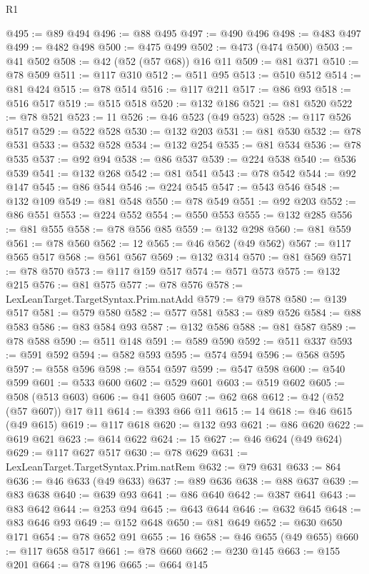 \begin{lexlean}{R1}
\begin{coremodule}
@495 := @89 @494
@496 := @88 @495
@497 := @490 @496
@498 := @483 @497
@499 := @482 @498
@500 := @475 @499
@502 := @473 (@474 @500)
@503 := @41 @502
@508 := @42 (@52 (@57 @68)) @16 @11
@509 := @81 @371
@510 := @78 @509
@511 := @117 @310
@512 := @511 @95
@513 := @510 @512
@514 := @81 @424
@515 := @78 @514
@516 := @117 @211
@517 := @86 @93
@518 := @516 @517
@519 := @515 @518
@520 := @132 @186
@521 := @81 @520
@522 := @78 @521
@523 := 11
@526 := @46 @523 (@49 @523)
@528 := @117 @526 @517
@529 := @522 @528
@530 := @132 @203
@531 := @81 @530
@532 := @78 @531
@533 := @532 @528
@534 := @132 @254
@535 := @81 @534
@536 := @78 @535
@537 := @92 @94
@538 := @86 @537
@539 := @224 @538
@540 := @536 @539
@541 := @132 @268
@542 := @81 @541
@543 := @78 @542
@544 := @92 @147
@545 := @86 @544
@546 := @224 @545
@547 := @543 @546
@548 := @132 @109
@549 := @81 @548
@550 := @78 @549
@551 := @92 @203
@552 := @86 @551
@553 := @224 @552
@554 := @550 @553
@555 := @132 @285
@556 := @81 @555
@558 := @78 @556 @85
@559 := @132 @298
@560 := @81 @559
@561 := @78 @560
@562 := 12
@565 := @46 @562 (@49 @562)
@567 := @117 @565 @517
@568 := @561 @567
@569 := @132 @314
@570 := @81 @569
@571 := @78 @570
@573 := @117 @159 @517
@574 := @571 @573
@575 := @132 @215
@576 := @81 @575
@577 := @78 @576
@578 := LexLeanTarget.TargetSyntax.Prim.natAdd
@579 := @79 @578
@580 := @139 @517
@581 := @579 @580
@582 := @577 @581
@583 := @89 @526
@584 := @88 @583
@586 := @83 @584 @93
@587 := @132 @586
@588 := @81 @587
@589 := @78 @588
@590 := @511 @148
@591 := @589 @590
@592 := @511 @337
@593 := @591 @592
@594 := @582 @593
@595 := @574 @594
@596 := @568 @595
@597 := @558 @596
@598 := @554 @597
@599 := @547 @598
@600 := @540 @599
@601 := @533 @600
@602 := @529 @601
@603 := @519 @602
@605 := @508 (@513 @603)
@606 := @41 @605
@607 := @62 @68
@612 := @42 (@52 (@57 @607)) @17 @11
@614 := @393 @66 @11
@615 := 14
@618 := @46 @615 (@49 @615)
@619 := @117 @618
@620 := @132 @93
@621 := @86 @620
@622 := @619 @621
@623 := @614 @622
@624 := 15
@627 := @46 @624 (@49 @624)
@629 := @117 @627 @517
@630 := @78 @629
@631 := LexLeanTarget.TargetSyntax.Prim.natRem
@632 := @79 @631
@633 := 864
@636 := @46 @633 (@49 @633)
@637 := @89 @636
@638 := @88 @637
@639 := @83 @638
@640 := @639 @93
@641 := @86 @640
@642 := @387 @641
@643 := @83 @642
@644 := @253 @94
@645 := @643 @644
@646 := @632 @645
@648 := @83 @646 @93
@649 := @152 @648
@650 := @81 @649
@652 := @630 @650 @171
@654 := @78 @652 @91
@655 := 16
@658 := @46 @655 (@49 @655)
@660 := @117 @658 @517
@661 := @78 @660
@662 := @230 @145
@663 := @155 @201
@664 := @78 @196
@665 := @664 @145

\end{coremodule}
\end{lexlean}
